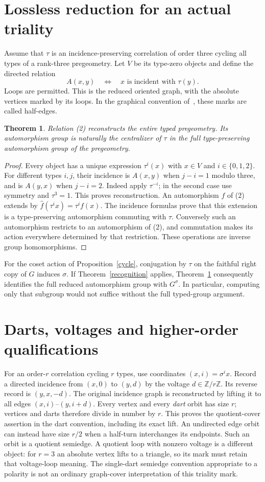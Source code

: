 \documentclass[11pt,a4paper]{article}
\newtheorem{theorem}{Theorem}\newtheorem{lemma}[theorem]{Lemma}\newtheorem{proposition}[theorem]{Proposition}
\begin{document}
\section{Lossless reduction for an actual triality}
Assume that $\tau$ is an incidence-preserving correlation of order three
cycling all types of a rank-three pregeometry. Let $V$ be its type-zero
objects and define the directed relation
\[
 A(x,y)\quad\Longleftrightarrow\quad x\text{ is incident with }\tau(y).
 \tag{2}
\]
Loops are permitted. This is the reduced oriented graph, with the absolute
vertices marked by its loops. In the graphical convention of~\cite{LS},
these marks are called half-edges.

\begin{theorem}\label{reduced}
Relation (2) reconstructs the entire typed pregeometry. Its automorphism
group is naturally the centralizer of $\tau$ in the full type-preserving
automorphism group of the pregeometry.
\end{theorem}
\begin{proof}
Every object has a unique expression $\tau^i(x)$ with $x\in V$ and
$i\in\{0,1,2\}$. For different types $i,j$, their incidence is $A(x,y)$
when $j-i=1$ modulo three, and is $A(y,x)$ when $j-i=2$.
Indeed apply $\tau^{-i}$; in the second case use symmetry and
$\tau^3=1$. This proves reconstruction.
An automorphism $f$ of (2) extends by
$\widehat f(\tau^i x)=\tau^i f(x)$. The incidence formulas prove that this
extension is a type-preserving automorphism commuting with $\tau$.
Conversely such an automorphism restricts to an automorphism of (2), and
commutation makes its action everywhere determined by that restriction.
These operations are inverse group homomorphisms.
\end{proof}
For the coset action of Proposition~\ref{cycle}, conjugation by $\tau$ on the
faithful right copy of $G$ induces $\sigma$. If Theorem~\ref{recognition}
applies, Theorem~\ref{reduced} consequently identifies the full reduced
automorphism group with $G^\sigma$. In particular, computing only that
subgroup would not suffice without the full typed-group argument.

\section{Darts, voltages and higher-order qualifications}
For an order-$r$ correlation cycling $r$ types, use coordinates
$(x,i)=\sigma^i x$. Record a directed incidence from $(x,0)$ to $(y,d)$
by the voltage $d\in\mathbb Z/r\mathbb Z$. Its reverse record is $(y,x,-d)$.
The original incidence graph is reconstructed by lifting it to all edges
$(x,i)$--$(y,i+d)$. Every vertex and every \emph{dart} orbit has size $r$;
vertices and darts therefore divide in number by $r$. This proves the
quotient-cover assertion in the dart convention, including its exact lift.
An undirected edge orbit can instead have size $r/2$ when a half-turn
interchanges its endpoints. Such an orbit is a quotient semiedge. A quotient
loop with nonzero voltage is a different object: for $r=3$ an absolute
vertex lifts to a triangle, so its mark must retain that voltage-loop meaning.
The single-dart semiedge convention appropriate to a polarity is not an
ordinary graph-cover interpretation of this triality mark.
\end{document}
